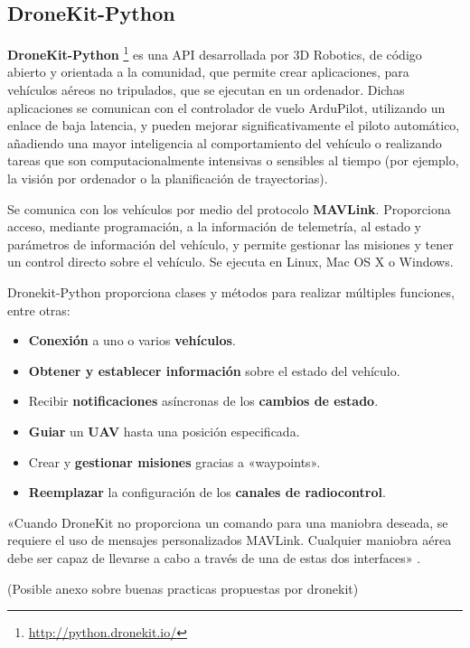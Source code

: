 \subsection{DroneKit-Python}
\label{sec:dronekit}

\textbf{DroneKit-Python} \footnote{\url{http://python.dronekit.io/}} es una \acs{API} desarrollada por 3D Robotics, de código abierto y orientada a la comunidad, que permite crear aplicaciones, para vehículos aéreos no tripulados, que se 
ejecutan en un ordenador. Dichas aplicaciones se comunican con el controlador de vuelo ArduPilot, utilizando un enlace de baja latencia, y pueden mejorar significativamente el piloto automático, añadiendo una mayor inteligencia al comportamiento del vehículo o realizando tareas que son computacionalmente intensivas o sensibles al tiempo (por ejemplo, la visión por ordenador o la planificación de trayectorias).

Se comunica con los vehículos por medio del protocolo \textbf{MAVLink}. Proporciona acceso, mediante programación, a la información 
de telemetría, al estado y parámetros de información del vehículo, y permite gestionar las misiones y tener un control directo 
sobre el vehículo. Se ejecuta en Linux, Mac OS X o Windows.

Dronekit-Python proporciona clases y métodos para realizar múltiples funciones, entre otras:
\begin{itemize}
\item \textbf{Conexión} a uno o varios \textbf{vehículos}.
\item \textbf{Obtener y establecer información} sobre el estado del vehículo.
\item Recibir \textbf{notificaciones} asíncronas de los \textbf{cambios de estado}.
\item \textbf{Guiar} un \textbf{\acs{UAV}} hasta una posición especificada.
\item Crear y \textbf{gestionar misiones} gracias a «waypoints».
\item \textbf{Reemplazar} la configuración de los \textbf{canales de radiocontrol}.
\end{itemize}

«Cuando DroneKit no proporciona un comando para una maniobra deseada, se requiere el uso de mensajes personalizados MAVLink.
Cualquier maniobra aérea debe ser capaz de llevarse a cabo a través de una de estas dos interfaces» \cite{dronekit}. 

(Posible anexo sobre buenas practicas propuestas por dronekit)

